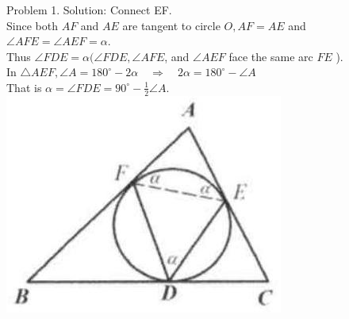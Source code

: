 \documentclass[10pt]{article}
\begin{document}
Problem 1. Solution:
Connect EF.\\
Since both \(A F\) and \(A E\) are tangent to circle \(O, A F=A E\) and \(\angle A F E=\angle A E F=\alpha\).\\
Thus \(\angle F D E=\alpha(\angle F D E, \angle A F E\), and \(\angle A E F\) face the same arc \(F E\) ).\\
In \(\triangle A E F, \angle A=180^{\circ}-2 \alpha \quad \Rightarrow \quad 2 \alpha=180^{\circ}-\angle A\)\\
That is \(\alpha=\angle F D E=90^{\circ}-\frac{1}{2} \angle A\).\\
\includegraphics[max width=\textwidth, center]{2025_04_17_97bc1f7e44d93c271a88g-171}
\end{document}
